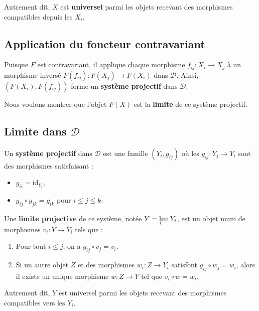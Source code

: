 \documentclass{article}
\begin{document}
	Autrement dit, \( X \) est \textbf{universel} parmi les objets recevant des morphismes compatibles depuis les \( X_i \).
	
	\subsection{Application du foncteur contravariant}
	Puisque \( F \) est contravariant, il applique chaque morphisme \( f_{ij}: X_i \to X_j \) \`a un morphisme invers\'e \( F(f_{ij}): F(X_j) \to F(X_i) \) dans \( \mathcal{D} \). Ainsi, \( (F(X_i), F(f_{ij})) \) forme un \textbf{syst\`eme projectif} dans \( \mathcal{D} \).
	
	Nous voulons montrer que l’objet \( F(X) \) est la \textbf{limite} de ce syst\`eme projectif.
	
	\subsection{Limite dans \( \mathcal{D} \)}
	Un \textbf{syst\`eme projectif} dans \( \mathcal{D} \) est une famille \( (Y_i, g_{ij}) \) o\`u les \( g_{ij}: Y_j \to Y_i \) sont des morphismes satisfaisant :
	\begin{itemize}
		\item \( g_{ii} = \text{id}_{Y_i} \),
		\item \( g_{ij} \circ g_{jk} = g_{ik} \) pour \( i \leq j \leq k \).
	\end{itemize}
	
	Une \textbf{limite projective} de ce syst\`eme, not\'ee \( Y = \varprojlim Y_i \), est un objet muni de morphismes \( v_i: Y \to Y_i \) tels que :
	\begin{enumerate}
		\item Pour tout \( i \leq j \), on a \( g_{ij} \circ v_j = v_i \).
		\item Si un autre objet \( Z \) et des morphismes \( w_i: Z \to Y_i \) satisfont \( g_{ij} \circ w_j = w_i \), alors il existe un unique morphisme \( w: Z \to Y \) tel que \( v_i \circ w = w_i \).
	\end{enumerate}
	
	Autrement dit, \( Y \) est universel parmi les objets recevant des morphismes compatibles vers les \( Y_i \).
	
\end{document}
